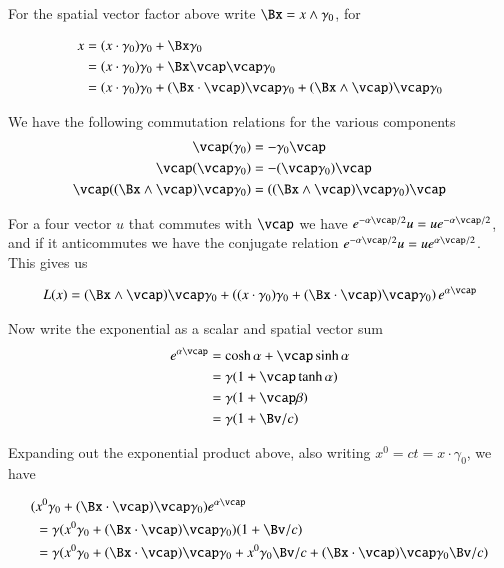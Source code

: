 \documentclass{article}
\begin{document}
For the spatial vector factor above write $\Bx = x \wedge \gamma_0$, for

\begin{align*}
x 
&= (x \cdot \gamma_0) \gamma_0 + \Bx \gamma_0 \\
&= (x \cdot \gamma_0) \gamma_0 + \Bx \vcap \vcap \gamma_0 \\
&= (x \cdot \gamma_0) \gamma_0 + (\Bx \cdot \vcap) \vcap \gamma_0 + (\Bx \wedge \vcap) \vcap \gamma_0 \\
\end{align*}

We have the following commutation relations for the various components
\begin{align*}
\vcap (\gamma_0) &= - \gamma_0 \vcap \\
\vcap (\vcap \gamma_0) &= - (\vcap \gamma_0) \vcap \\
\vcap ((\Bx \wedge \vcap) \vcap \gamma_0 ) 
&= ((\Bx \wedge \vcap) \vcap \gamma_0) \vcap
\end{align*}

For a four vector $u$ that commutes with $\vcap$ we have $e^{-\alpha \vcap/2} u = u e^{-\alpha \vcap/2}$, and if it anticommutes
we have the conjugate relation
$e^{-\alpha \vcap/2} u = u e^{\alpha \vcap/2}$.  This gives us

\begin{align*}
L(x) 
&= 
(\Bx \wedge \vcap) \vcap \gamma_0 +
\left( (x \cdot \gamma_0) \gamma_0 + (\Bx \cdot \vcap) \vcap \gamma_0 \right) e^{\alpha \vcap} \\
\end{align*}

Now write the exponential as a scalar and spatial vector sum
\begin{align*}
e^{\alpha \vcap}
&= 
\cosh\alpha 
+\vcap \sinh\alpha 
\\
&= 
\gamma (1 +\vcap \tanh\alpha )
\\
&= 
\gamma (1 +\vcap \beta)
\\
&= 
\gamma (1 + \Bv/c )
\\
\end{align*}

Expanding out the exponential product above, also writing $x^0 = ct = x \cdot \gamma_0$, we have

\begin{align*}
( &x^0 \gamma_0 + (\Bx \cdot \vcap) \vcap \gamma_0 ) e^{\alpha \vcap} \\
&=
\gamma ( x^0 \gamma_0 + (\Bx \cdot \vcap) \vcap \gamma_0 ) ( 1 + \Bv/c ) \\
&=
\gamma ( 
x^0 \gamma_0 
+ (\Bx \cdot \vcap) \vcap \gamma_0 
+x^0 \gamma_0 \Bv/c  
+ (\Bx \cdot \vcap) \vcap \gamma_0 \Bv/c
) \\
\end{align*}
\end{document}

